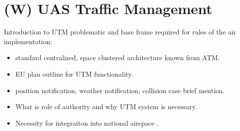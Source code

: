 \section{(W) UAS Traffic Management}\label{sec:UASTrafficManagement}
    \noindent Introduction to UTM problematic and base frame required for rules of the air implementation:
    \begin{itemize}
        \item standard centralized, space clustered architecture known from ATM.
        \item EU plan outline for UTM functionality.
        \item position notification, weather notification, collision case brief mention.
        \item What is role of authority and why UTM system is necessary.
		\item Necessity for integraiton into national airspace \cite{spriesterbach2013unmanned}.
    \end{itemize}